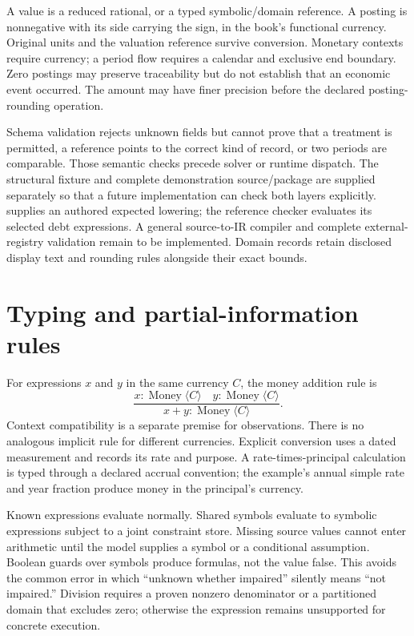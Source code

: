 A value is a reduced rational, or a typed symbolic/domain reference. A
posting is nonnegative with its side carrying the sign, in the book's
functional currency. Original units and the valuation reference survive
conversion. Monetary contexts require currency; a period flow requires a
calendar and exclusive end boundary. Zero postings may preserve traceability
but do not establish that an economic event occurred. The amount may have
finer precision before the declared posting-rounding operation.

Schema validation rejects unknown fields but cannot prove that a treatment
is permitted, a reference points to the correct kind of record, or two periods
are comparable. Those semantic checks precede solver or runtime dispatch.
The structural fixture and complete demonstration source/package are supplied
separately so that a future implementation can check both layers explicitly.
 supplies an authored expected lowering;
the reference checker evaluates its selected debt expressions. A general
source-to-IR compiler and complete external-registry validation remain to be
implemented. Domain records retain disclosed display text and rounding rules
alongside their exact bounds.

\section{Typing and partial-information rules}

For expressions $x$ and $y$ in the same currency $C$, the money addition rule is
\[
 \frac{x:\operatorname{Money}\langle C\rangle\quad
       y:\operatorname{Money}\langle C\rangle}
      {x+y:\operatorname{Money}\langle C\rangle}.
\]
Context compatibility is a separate premise for observations. There is no
analogous implicit rule for different currencies. Explicit conversion uses
a dated measurement and records its rate and purpose. A rate-times-principal
calculation is typed through a declared accrual convention; the example's
annual simple rate and year fraction produce money in the principal's currency.

Known expressions evaluate normally. Shared symbols evaluate to symbolic
expressions subject to a joint constraint store. Missing source values cannot
enter arithmetic until the model supplies a symbol or a conditional assumption.
Boolean guards over symbols produce formulas, not the value false. This avoids
the common error in which ``unknown whether impaired'' silently means
``not impaired.'' Division requires a proven nonzero denominator or a
partitioned domain that excludes zero; otherwise the expression remains
unsupported for concrete execution.

